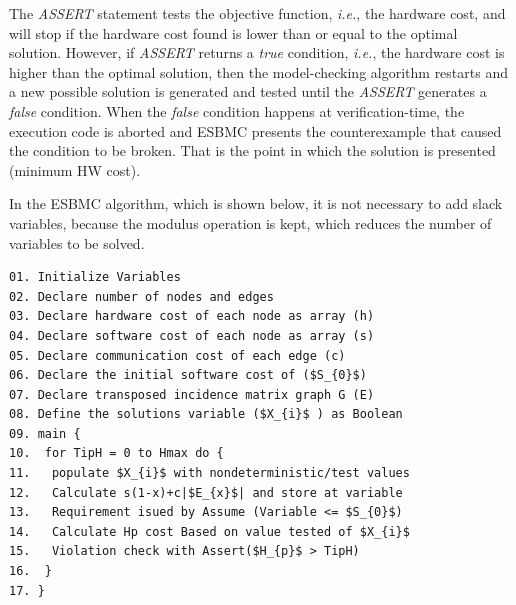 The \textit{ASSERT} statement tests the objective function, {\it i.e.}, the hardware cost, and will stop if the hardware cost found is lower than or equal to the optimal solution. However, if \textit{ASSERT} returns a \textit{true} condition, {\it i.e.}, the hardware cost is higher than the optimal solution, then the model-checking algorithm restarts and a new possible solution is generated and tested until the \textit{ASSERT} generates a \textit{false} condition. When the \textit{false} condition happens at verification-time, the execution code is aborted and ESBMC presents the counterexample that caused the condition to be broken. That is the point in which the solution is presented (minimum HW cost).

In the ESBMC algorithm, which is shown below, it is not necessary to add slack variables, because the modulus operation is kept, which reduces the number of variables to be solved. 

\begin{lstlisting}[caption=Pseudocode describing ESBMC, mathescape]
01. Initialize Variables 
02. Declare number of nodes and edges
03. Declare hardware cost of each node as array (h)
04. Declare software cost of each node as array (s)
05. Declare communication cost of each edge (c)
06. Declare the initial software cost of ($S_{0}$)
07. Declare transposed incidence matrix graph G (E)
08. Define the solutions variable ($X_{i}$ ) as Boolean
09. main {
10.  for TipH = 0 to Hmax do {
11.   populate $X_{i}$ with nondeterministic/test values
12.   Calculate s(1-x)+c|$E_{x}$| and store at variable
13.   Requirement isued by Assume (Variable <= $S_{0}$)
14.   Calculate Hp cost Based on value tested of $X_{i}$
15.   Violation check with Assert($H_{p}$ > TipH)
16.  }
17. }
\end{lstlisting}





